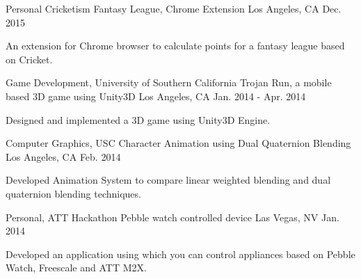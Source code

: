 \begin{cventries}
  \cventry
    {Personal}
    {Cricketism Fantasy League, Chrome Extension}
    {Los Angeles, CA}
    {Dec. 2015}
    {
      \begin{cvitems}
        \item {An extension for Chrome browser to calculate points for a fantasy league based on Cricket.}
      \end{cvitems}
    }
  \cventry
    {Game Development, University of Southern California}
    {Trojan Run, a mobile based 3D game using Unity3D}
    {Los Angeles, CA}
    {Jan. 2014 - Apr. 2014}
    {
      \begin{cvitems}
        \item {Designed and implemented a 3D game using Unity3D Engine.}
      \end{cvitems}
    }
   \cventry
    {Computer Graphics, USC}
    {Character Animation using Dual Quaternion Blending}
    {Los Angeles, CA}
    {Feb. 2014}
    {
      \begin{cvitems}
        \item {Developed Animation System to compare linear weighted blending and dual quaternion blending techniques.}
      \end{cvitems}
    }
  \cventry
    {Personal, ATT Hackathon}
    {Pebble watch controlled device}
    {Las Vegas, NV}
    {Jan. 2014}
    {
      \begin{cvitems}
        \item {Developed an application using which you can control appliances based on Pebble Watch, Freescale and ATT M2X.}
      \end{cvitems}
    }  
      
\end{cventries}

